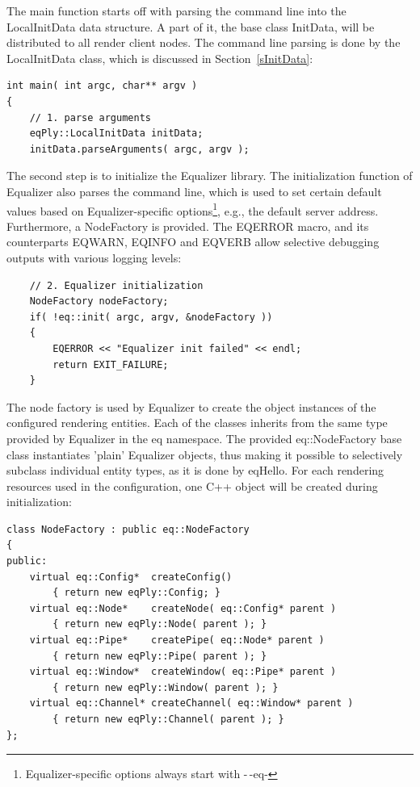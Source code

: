 \documentclass[10pt,a4]{scrartcl}
\newcommand{\sref}[1]{Section~\ref{#1}}
\begin{document}
The main function starts off with parsing the command line into the
\textsf{LocalInitData} data structure. A part of it, the base class
\textsf{InitData}, will be distributed to all render client nodes. The
command line parsing is done by the \textsf{LocalInitData} class, which
is discussed in \sref{sInitData}:

{\footnotesize\begin{lstlisting}
int main( int argc, char** argv )
{
    // 1. parse arguments
    eqPly::LocalInitData initData;
    initData.parseArguments( argc, argv );
\end{lstlisting}}

The second step is to initialize the Equalizer library. The
initialization function of Equalizer also parses the command line, which
is used to set certain default values based on Equalizer-specific
options\footnote{Equalizer-specific options always start with -\,-eq-},
e.g., the default server address. Furthermore, a \textsf{NodeFactory} is
provided. The \textsf{EQERROR} macro, and its counterparts
\textsf{EQWARN}, \textsf{EQINFO} and \textsf{EQVERB} allow selective
debugging outputs with various logging levels:

{\footnotesize\begin{lstlisting}
    // 2. Equalizer initialization
    NodeFactory nodeFactory;
    if( !eq::init( argc, argv, &nodeFactory ))
    {
        EQERROR << "Equalizer init failed" << endl;
        return EXIT_FAILURE;
    }
\end{lstlisting}}%

The node factory is used by Equalizer to create the object instances of
the configured rendering entities. Each of the classes inherits from the
same type provided by Equalizer in the \textsf{eq} namespace. The
provided \textsf{eq::NodeFactory} base class instantiates 'plain'
Equalizer objects, thus making it possible to selectively subclass
individual entity types, as it is done by \textsf{eqHello}. For each
rendering resources used in the configuration, one C++ object will be
created during initialization:

{\footnotesize\begin{lstlisting}
class NodeFactory : public eq::NodeFactory
{
public:
    virtual eq::Config*  createConfig()  
        { return new eqPly::Config; }
    virtual eq::Node*    createNode( eq::Config* parent )  
        { return new eqPly::Node( parent ); }
    virtual eq::Pipe*    createPipe( eq::Node* parent )
        { return new eqPly::Pipe( parent ); }
    virtual eq::Window*  createWindow( eq::Pipe* parent )
        { return new eqPly::Window( parent ); }
    virtual eq::Channel* createChannel( eq::Window* parent )
        { return new eqPly::Channel( parent ); }
};
\end{lstlisting}}
\end{document}
